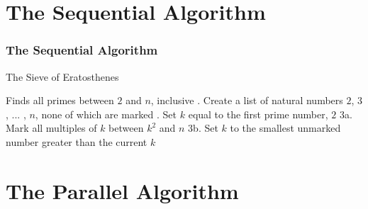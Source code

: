 \documentclass[13pt]{beamer}
\begin{document}
\section{The Sequential Algorithm} %
\begin{frame}
\frametitle{The Sequential Algorithm}
  \begin{algorithm}[H]
        \caption{The Sieve of Eratosthenes}
        \begin{algorithmic}
          \REQUIRE Finds all primes between $2$ and $n$, inclusive
          . Create a list of natural numbers $2$, $3$, ... , $n$, none of which are marked
          . Set $k$ equal to the first prime number, $2$
            \STATE 3a. Mark all multiples of $k$ between $k^2$ and $n$
            \STATE 3b. Set $k$ to the smallest unmarked number greater than the current $k$
          \ENDWHILE
        \end{algorithmic}
        \end{algorithm}
\end{frame}

\section{The Parallel Algorithm} %
\end{document}
